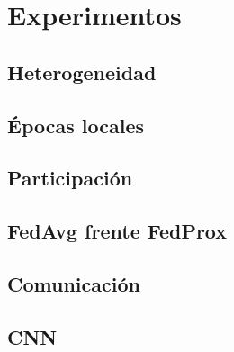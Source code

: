 \section{Experimentos}

\subsection{Heterogeneidad}

\subsection{Épocas locales} 

\subsection{Participación}

\subsection{FedAvg frente FedProx}

\subsection{Comunicación}

\subsection{CNN}